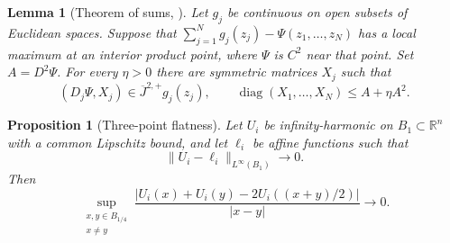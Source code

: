 \documentclass[11pt]{article}
\numberwithin{equation}{section}
\newtheorem{proposition}[theorem]{Proposition}
\newtheorem{lemma}[theorem]{Lemma}
\theoremstyle{definition}
\theoremstyle{remark}
\newcommand{\R}{\mathbb{R}}
\begin{document}
\begin{lemma}[Theorem of sums, {\cite[Theorem~3.2]{CIL1992}}]\label{lem:sum-rule}
Let $g_j$ be continuous on open subsets of Euclidean spaces. Suppose that $\sum_{j=1}^N g_j(z_j)-\Psi(z_1,\ldots,z_N)$ has a local maximum at an interior product point, where $\Psi$ is $C^2$ near that point. Set $A=D^2\Psi$. For every $\eta>0$ there are symmetric matrices $X_j$ such that
\[
  (D_j\Psi,X_j)\in\overline J^{2,+}g_j(z_j),\qquad
  \operatorname{diag}(X_1,\ldots,X_N)\le A+\eta A^2.
\]
\end{lemma}

\begin{proposition}[Three-point flatness]\label{prop:three-point}
Let $U_i$ be infinity-harmonic on $B_1\subset\R^n$ with a common Lipschitz bound, and let $\ell_i$ be affine functions such that
\[
  \|U_i-\ell_i\|_{L^\infty(B_1)}\longrightarrow0.
\]
Then
\begin{equation}\label{eq:three-point}
  \sup_{\substack{x,y\in B_{1/4}\\x\ne y}}
  \frac{|U_i(x)+U_i(y)-2U_i((x+y)/2)|}{|x-y|}
  \longrightarrow0.
\end{equation}
\end{proposition}
\end{document}
